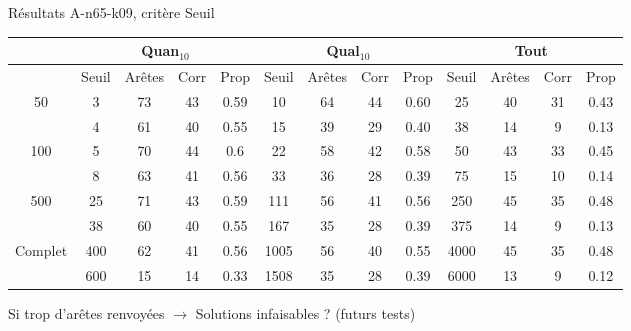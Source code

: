 \documentclass{beamer}
\begin{document}
\begin{frame}{Résultats A-n65-k09, critère Seuil}

\begin{table}[H]

\begin{tabular}{|@{}c@{}|@{}c@{}|@{}c@{}|@{}c@{}|@{}c@{}||@{}c@{}|@{}c@{}|@{}c@{}|@{}c@{}||@{}c@{}|@{}c@{}|@{}c@{}|@{}c@{}|}

\hline
 & \multicolumn{4}{c|}{Quan$_{10}$} & \multicolumn{4}{c|}{Qual$_{10}$} & \multicolumn{4}{c|}{Tout} \\
 \hline
 & Seuil & Arêtes & Corr & Prop & Seuil & Arêtes & Corr & Prop & Seuil & Arêtes & Corr & Prop \\
 \hline
 50 & 3 & 73 & 43 & 0.59 & 10 & 64 & 44 & 0.60 & 25 & 40 & 31 & 0.43 \\
 \cline{2-13} 
    & 4 & 61 & 40 & 0.55 & 15 & 39 & 29 & 0.40 & 38 & 14 & 9 & 0.13 \\
  \hline
   100 & 5 & 70 & 44 & 0.6 & 22 & 58 & 42 & 0.58 & 50 & 43 & 33 & 0.45 \\
 \cline{2-13} 
    & 8 & 63 & 41 & 0.56 & 33 & 36 & 28 & 0.39 & 75 & 15 & 10 & 0.14 \\
  \hline
   500 & 25 & 71 & 43 & 0.59 & 111 & 56 & 41 & 0.56 & 250 & 45 & 35 & 0.48 \\
 \cline{2-13} 
    & 38 & 60 & 40 & 0.55 & 167 & 35 & 28 & 0.39 & 375 & 14 & 9 & 0.13 \\
  \hline
   Complet & 400 & 62 & 41 & 0.56 & 1005 & 56 & 40 & 0.55 & 4000 & 45 & 35 & 0.48 \\
 \cline{2-13} 
    & 600 & 15 & 14 & 0.33 & 1508 & 35 & 28 & 0.39 & 6000 & 13 & 9 & 0.12 \\
  \hline

\end{tabular}


\end{table}

Si trop d'arêtes renvoyées $\rightarrow$ Solutions infaisables ? (futurs tests)


\end{frame}
\end{document}
